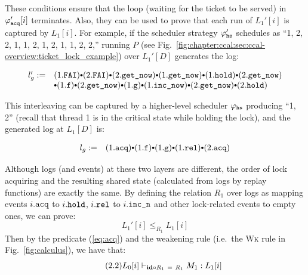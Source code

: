 \noindent These conditions ensure that the loop (waiting for the ticket 
to be served) in $\varphi_{{\mathrm{\texttt{acq}}}}'[i]$  terminates. Also, they can be used to prove that each run of $L_1'[i]$ is captured by $L_1[i]$. For example, if the scheduler strategy  $\varphi_{{\mathrm{\texttt{hs}}}}'$ schedules as  ``1, 2, 2, 1, 1, 2, 1, 2, 1, 1, 2, 2,'' running $P$ (see Fig.~\ref{fig:chapter:ccal:sec:ccal-overview:ticket_lock_example}) over $L_1'[D]$ generates the log:%

\begin{small}
\[
\begin{array}{rl}
l'_{g} := &
 (1.\incticket) \cons
(2.\incticket) \cons
(2.\getnow) \cons
(1.\getnow)  \cons 
 (1.\holdlock) \cons 
(2.\getnow) \\
&
\cons (1.\codeinmath{f})
\cons (2.\getnow)
\cons (1.\codeinmath{g})
\cons (1.\incnow) 
\cons (2.\getnow)
\cons (2.\holdlock) 
\end{array}
\]
\end{small}

\noindent This interleaving can be captured by a higher-level scheduler $\varphi_{{\mathrm{\texttt{hs}}}}$ producing ``1, 2'' (recall that thread 1 is in the critical state while holding the lock),
and the generated log at $L_1[D]$ is:%
\begin{small}
\[
\begin{array}{rl}
l_{g} := &
 (1.\codeinmath{acq})
\cons (1.\codeinmath{f})
\cons (1.\codeinmath{g})
\cons (1.\codeinmath{rel})
\cons 
 (2.\codeinmath{acq}) 
\end{array}
\]
\end{small}%
Although logs (and events) at these two layers are different, the order of lock acquiring and 
the resulting shared state (calculated from logs by replay functions) are exactly the same. By defining the relation $R_1$ over logs as mapping events $i.{\mathrm{\texttt{acq}}}$ to $i.{\mathrm{\texttt{hold}}}$, $i.{\mathrm{\texttt{rel}}}$  to $i.{\mathrm{\texttt{inc\_n}}}$ and other lock-related events to empty ones, we can prove:%
$$L_1'[i] \le_{R_1} L_1[i]$$
Then by the predicate (\ref{eq:acq}) and the weakening rule (i.e.\, the \textsc{Wk} rule in Fig.~\ref{fig:calculus}), we have that:%
\begin{equation}\label{eq:acq:h} \tag{2.2}
L_0[i] \vdash_{\textbf{id} \circ R_1\ =\ R_1} M_1 : L_1[i]
\end{equation}


